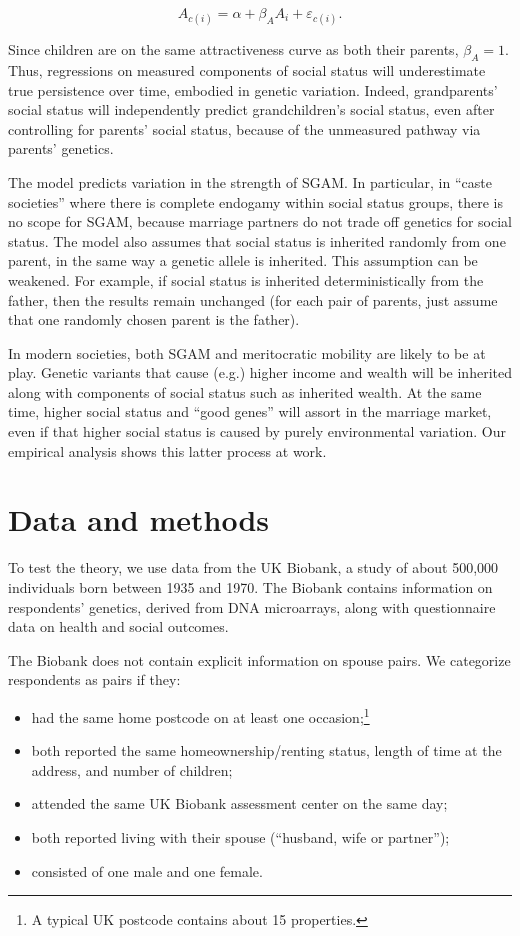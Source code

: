 \documentclass[
]{article}
\providecommand{\tightlist}{%
  \setlength{\itemsep}{0pt}\setlength{\parskip}{0pt}}
\begin{document}
\[
A_{c(i)} = \alpha + \beta_A A_i + \varepsilon_{c(i)}.
\]

Since children are on the same attractiveness curve as both their
parents, \(\beta_A = 1\). Thus, regressions on measured components of
social status will underestimate true persistence over time, embodied in
genetic variation. Indeed, grandparents' social status will
independently predict grandchildren's social status, even after
controlling for parents' social status, because of the unmeasured
pathway via parents' genetics.

The model predicts variation in the strength of SGAM. In particular, in
``caste societies'' where there is complete endogamy within social status
groups, there is no scope for SGAM, because marriage partners do not
trade off genetics for social status. The model also assumes that social
status is inherited randomly from one parent, in the same way a genetic
allele is inherited. This assumption can be weakened. For example, if
social status is inherited deterministically from the father, then the
results remain unchanged (for each pair of parents, just assume that one
randomly chosen parent is the father).

In modern societies, both SGAM and meritocratic mobility are likely to
be at play. Genetic variants that cause (e.g.) higher income and wealth
will be inherited along with components of social status such as
inherited wealth. At the same time, higher social status and ``good
genes'' will assort in the marriage market, even if that higher social
status is caused by purely environmental variation. Our empirical
analysis shows this latter process at work.

\hypertarget{data-and-methods}{%
\section{Data and methods}\label{data-and-methods}}

To test the theory, we use data from the UK Biobank, a study of about
500,000 individuals born between 1935 and 1970. The Biobank contains
information on respondents' genetics, derived from DNA microarrays,
along with questionnaire data on health and social outcomes.

The Biobank does not contain explicit information on spouse pairs. We
categorize respondents as pairs if they:

\begin{itemize}
\tightlist
\item
  had the same home postcode on at least one occasion;\footnote{A typical UK postcode contains about 15 properties.}
\item
  both reported the same homeownership/renting status, length of time
  at the address, and number of children;
\item
  attended the same UK Biobank assessment center on the same day;
\item
  both reported living with their spouse (``husband, wife or partner'');
\item
  consisted of one male and one female.
\end{itemize}
\end{document}
